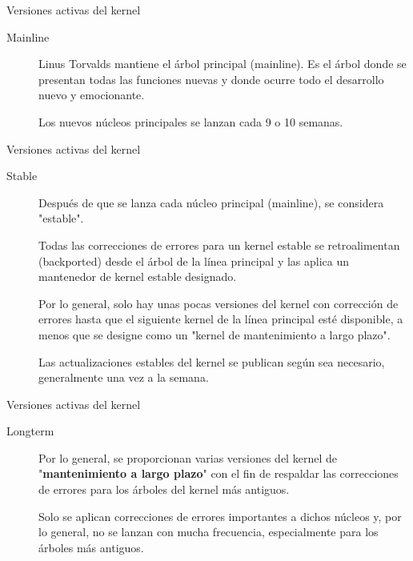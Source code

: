 \begin{frame}[c]{Versiones activas del kernel}
  \begin{description}
    \item[Mainline] Linus Torvalds mantiene el árbol principal (mainline).
      Es el árbol donde se presentan todas las funciones nuevas y donde
      ocurre todo el desarrollo nuevo y emocionante.

      \vspace{\baselineskip}
      Los nuevos núcleos principales se lanzan cada 9 o 10 semanas.
  \end{description}
\end{frame}

\begin{frame}[c]{Versiones activas del kernel}
  \begin{description}
    \item[Stable] Después de que se lanza cada núcleo principal (mainline),
      se considera "estable".

      \vspace{\baselineskip}
      Todas las correcciones de errores para un kernel estable se
      retroalimentan (backported) desde el árbol de la línea principal
      y las aplica un mantenedor de kernel estable designado.

      \vspace{\baselineskip}
      Por lo general, solo hay unas pocas versiones del kernel con corrección
      de errores hasta que el siguiente kernel de la línea principal esté
      disponible, a menos que se designe como un
      "kernel de mantenimiento a largo plazo".

      \vspace{\baselineskip}
      Las actualizaciones estables del kernel se publican según sea
      necesario, generalmente una vez a la semana.
  \end{description}
\end{frame}

\begin{frame}[c]{Versiones activas del kernel}
  \begin{description}
    \item[Longterm] Por lo general, se proporcionan varias versiones del
      kernel de "\textbf{mantenimiento a largo plazo}" con el fin de
      respaldar las correcciones de errores para los árboles del kernel
      más antiguos.

      \vspace{\baselineskip}
      Solo se aplican correcciones de errores importantes a dichos núcleos
      y, por lo general, no se lanzan con mucha frecuencia,
      especialmente para los árboles más antiguos.
  \end{description}
\end{frame}

